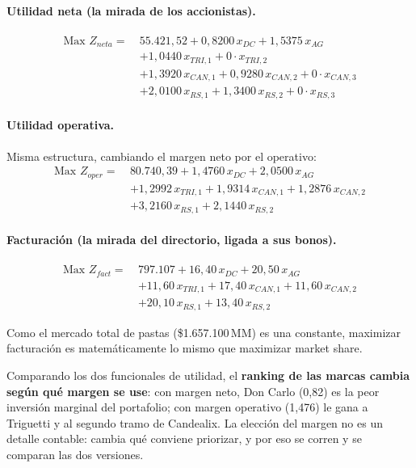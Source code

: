 \documentclass[10pt,a4paper]{article}
\begin{document}
\paragraph{Utilidad neta (la mirada de los accionistas).}
\[
\begin{aligned}
\text{Max } Z_{neta} = \ & 55.421{,}52
+ 0{,}8200\,x_{DC} + 1{,}5375\,x_{AG} \\
& + 1{,}0440\,x_{TRI,1} + 0\cdot x_{TRI,2} \\
& + 1{,}3920\,x_{CAN,1} + 0{,}9280\,x_{CAN,2} + 0\cdot x_{CAN,3}\\
& + 2{,}0100\,x_{RS,1} + 1{,}3400\,x_{RS,2} + 0\cdot x_{RS,3}
\end{aligned}
\]

\paragraph{Utilidad operativa.} Misma estructura, cambiando el margen neto por
el operativo:
\[
\begin{aligned}
\text{Max } Z_{oper} = \ & 80.740{,}39
+ 1{,}4760\,x_{DC} + 2{,}0500\,x_{AG} \\
& + 1{,}2992\,x_{TRI,1} + 1{,}9314\,x_{CAN,1} + 1{,}2876\,x_{CAN,2} \\
& + 3{,}2160\,x_{RS,1} + 2{,}1440\,x_{RS,2}
\end{aligned}
\]

\paragraph{Facturación (la mirada del directorio, ligada a sus bonos).}
\[
\begin{aligned}
\text{Max } Z_{fact} = \ & 797.107
+ 16{,}40\,x_{DC} + 20{,}50\,x_{AG} \\
& + 11{,}60\,x_{TRI,1} + 17{,}40\,x_{CAN,1} + 11{,}60\,x_{CAN,2} \\
& + 20{,}10\,x_{RS,1} + 13{,}40\,x_{RS,2}
\end{aligned}
\]

Como el mercado total de pastas (\$1.657.100\,MM) es una constante, maximizar
facturación es matemáticamente lo mismo que maximizar market share.

Comparando los dos funcionales de utilidad, el \textbf{ranking de las marcas
cambia según qué margen se use}: con margen neto, Don Carlo (0,82) es la peor inversión
marginal del portafolio; con margen operativo (1,476) le gana a Triguetti y al
segundo tramo de Candealix. La elección del margen no es un detalle contable:
cambia qué conviene priorizar, y por eso se corren y se comparan las dos
versiones.
\end{document}
